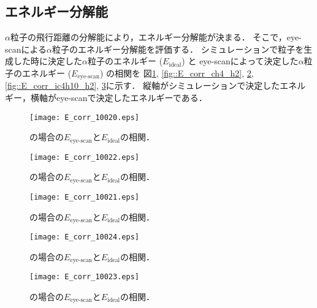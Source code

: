 \documentclass[../master]{subfiles}
\begin{document}
\subsection{エネルギー分解能}
$\alpha$粒子の飛行距離の分解能により，エネルギー分解能が決まる．
そこで，eye-scanによる$\alpha$粒子のエネルギー分解能を評価する．
シミュレーションで粒子を生成した時に決定した$\alpha$粒子のエネルギー ($E_{\text{ideal}}$) と
eye-scanによって決定した$\alpha$粒子のエネルギー ($E_{\text{eye-scan}}$) の相関を
図\ref{fig::E_corr_ch4}, \ref{fig::E_corr_ch4_h2}, \ref{fig::E_corr_ch4_he},
\ref{fig::E_corr_ic4h10_h2}, \ref{fig::E_corr_ic4h10_he}に示す．
縦軸がシミュレーションで決定したエネルギー，横軸がeye-scanで決定したエネルギーである．
\begin{figure}
  \centering
  \begin{minipage}{0.45\columnwidth}
    \centering
    \texttt{[image: E\_corr\_10020.eps]}
    \caption{\Methane の場合の$E_{\text{eye-scan}}$と$E_{\text{ideal}}$の相関．}
    \label{fig::E_corr_ch4}
  \end{minipage}  
\end{figure}
\begin{figure}
  \centering
  \begin{minipage}{0.45\columnwidth}
    \centering
    \texttt{[image: E\_corr\_10022.eps]}
    \caption{\MethaneHydro の場合の$E_{\text{eye-scan}}$と$E_{\text{ideal}}$の相関．}
    \label{fig::E_corr_ch4_h2}
  \end{minipage}
  \begin{minipage}{0.45\columnwidth}
    \centering
    \texttt{[image: E\_corr\_10021.eps]}
    \caption{\MethaneHerium の場合の$E_{\text{eye-scan}}$と$E_{\text{ideal}}$の相関．}
    \label{fig::E_corr_ch4_he}
  \end{minipage}
\end{figure}
\begin{figure}
  \centering
  \begin{minipage}{0.45\columnwidth}
    \centering
    \texttt{[image: E\_corr\_10024.eps]}
    \caption{\isoButaneHydro の場合の$E_{\text{eye-scan}}$と$E_{\text{ideal}}$の相関．}
    \label{fig::E_corr_ic4h10_h2}
  \end{minipage}
  \begin{minipage}{0.45\columnwidth}
    \centering
    \texttt{[image: E\_corr\_10023.eps]}
    \caption{\isoButaneHerium の場合の$E_{\text{eye-scan}}$と$E_{\text{ideal}}$の相関．}
    \label{fig::E_corr_ic4h10_he}
  \end{minipage}
\end{figure}
\end{document}
